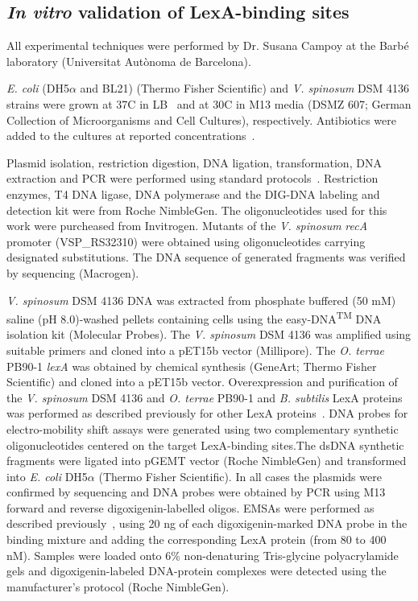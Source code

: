 \subsection{\textit{In vitro} validation of LexA-binding sites}

All experimental techniques were performed by Dr. Susana Campoy at the Barbé
laboratory (Universitat Autònoma de Barcelona).

\textit{E. coli} (DH5$\alpha$ and BL21) (Thermo Fisher Scientific) and
\textit{V. spinosum} DSM 4136 strains were grown at 37\textdegree C in
LB~\citep{green264molecular} and at 30\textdegree C in M13 media (DSMZ 607;
German Collection of Microorganisms and Cell Cultures),
respectively. Antibiotics were added to the cultures at reported
concentrations~\citep{green264molecular}.

Plasmid isolation, restriction digestion, DNA ligation, transformation, DNA
extraction and PCR were performed using standard
protocols~\citep{green264molecular}. Restriction enzymes, T4 DNA ligase, DNA
polymerase and the DIG-DNA labeling and detection kit were from Roche
NimbleGen. The oligonucleotides used for this work were purcheased from
Invitrogen. Mutants of the \textit{V. spinosum} \textit{recA} promoter
(VSP\_RS32310) were obtained using oligonucleotides carrying designated
substitutions. The DNA sequence of generated fragments was verified by
sequencing (Macrogen).

\textit{V. spinosum} DSM 4136 DNA was extracted from phosphate buffered (50 mM)
saline (pH 8.0)-washed pellets containing cells using the easy-DNA\textsuperscript{TM} DNA
isolation kit (Molecular Probes). The \textit{V. spinosum} DSM 4136 was
amplified using suitable primers and cloned into a pET15b vector
(Millipore). The \textit{O. terrae} PB90-1 \textit{lexA} was obtained by
chemical synthesis (GeneArt; Thermo Fisher Scientific) and cloned into a pET15b
vector. Overexpression and purification of the \textit{V. spinosum} DSM 4136
and \textit{O. terrae} PB90-1 and \textit{B. subtilis} LexA proteins was
performed as described previously for other LexA
proteins~\citep{cambray2011prevalence, cornish2014characterization}. DNA probes
for electro-mobility shift assays were generated using two complementary
synthetic oligonucleotides centered on the target LexA-binding sites.The dsDNA
synthetic fragments were ligated into pGEMT vector (Roche NimbleGen) and
transformed into \textit{E. coli} DH5$\alpha$ (Thermo Fisher Scientific). In
all cases the plasmids were confirmed by sequencing and DNA probes were
obtained by PCR using M13 forward and reverse digoxigenin-labelled
oligos. EMSAs were performed as described
previously~\citep{sanchez2012analysis}, using 20 ng of each digoxigenin-marked
DNA probe in the binding mixture and adding the corresponding LexA protein
(from 80 to 400 nM). Samples were loaded onto 6\% non-denaturing Tris-glycine
polyacrylamide gels and digoxigenin-labeled DNA-protein complexes were detected
using the manufacturer's protocol (Roche NimbleGen).



